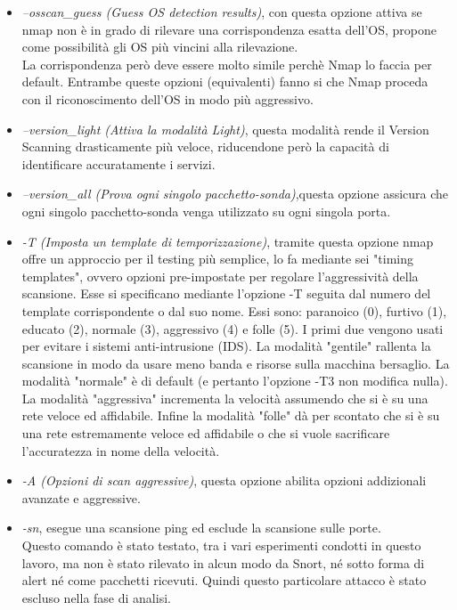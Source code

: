 	\begin{itemize}
	    \item \textit{ --osscan\_guess (Guess OS detection results)}, con questa opzione attiva se nmap non è in grado di rilevare una corrispondenza esatta dell'OS, propone come possibilità gli OS più vincini alla rilevazione.\\ La corrispondenza però deve essere molto simile perchè Nmap lo faccia per default. Entrambe queste opzioni (equivalenti) fanno si che Nmap proceda con il riconoscimento dell'OS in modo più aggressivo.
	    \item \textit{--version\_light (Attiva la modalità Light)}, questa modalità rende il Version Scanning drasticamente più veloce, riducendone però la capacità di identificare accuratamente i servizi.
	    \item \textit{--version\_all (Prova ogni singolo pacchetto-sonda)},questa opzione assicura che ogni singolo pacchetto-sonda venga utilizzato su ogni singola porta.
	    \item \textit{-T (Imposta un template di temporizzazione)}, tramite questa opzione nmap offre un approccio per il testing più semplice, lo fa mediante sei "timing templates", ovvero opzioni pre-impostate per regolare l'aggressività della scansione. Esse si specificano mediante l'opzione -T seguita dal numero del template
	           corrispondente o dal suo nome. Essi sono: paranoico (0), furtivo (1), educato (2), normale (3), aggressivo (4) e folle (5). I primi due vengono usati per evitare i sistemi anti-intrusione (IDS). La modalità "gentile" rallenta la scansione in modo da usare meno banda e risorse sulla macchina bersaglio. La modalità  "normale" è di default (e pertanto l'opzione -T3 non modifica nulla). La modalità "aggressiva" incrementa la velocità assumendo che si è su una rete veloce ed affidabile. Infine la modalità "folle" dà per scontato che si è su una rete estremamente veloce ed affidabile o che si vuole sacrificare l'accuratezza in nome della velocità.
	
	    \item \textit{-A (Opzioni di scan aggressive)}, questa opzione abilita opzioni addizionali avanzate e aggressive.
	
	    \item \textit{-sn}, esegue una scansione ping ed esclude la scansione sulle porte.\\Questo comando è stato testato, tra i vari esperimenti condotti in questo lavoro, ma non è stato rilevato in alcun modo da Snort, né sotto forma di alert né come pacchetti ricevuti. Quindi questo particolare attacco è stato escluso nella fase di analisi.
	
	
	\end{itemize}
	
